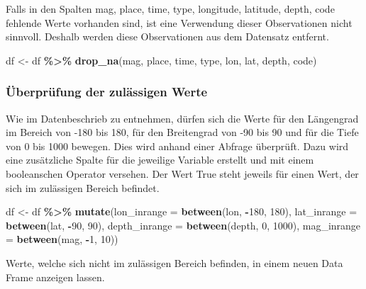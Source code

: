 \documentclass[
]{article}
\newenvironment{Shaded}{\begin{snugshade}}{\end{snugshade}}
\newcommand{\AttributeTok}[1]{\textcolor[rgb]{0.13,0.29,0.53}{#1}}
\newcommand{\DecValTok}[1]{\textcolor[rgb]{0.00,0.00,0.81}{#1}}
\newcommand{\FunctionTok}[1]{\textcolor[rgb]{0.13,0.29,0.53}{\textbf{#1}}}
\newcommand{\NormalTok}[1]{#1}
\newcommand{\OtherTok}[1]{\textcolor[rgb]{0.56,0.35,0.01}{#1}}
\newcommand{\SpecialCharTok}[1]{\textcolor[rgb]{0.81,0.36,0.00}{\textbf{#1}}}
\begin{document}
Falls in den Spalten mag, place, time, type, longitude, latitude, depth,
code fehlende Werte vorhanden sind, ist eine Verwendung dieser
Observationen nicht sinnvoll. Deshalb werden diese Observationen aus dem
Datensatz entfernt.

\begin{Shaded}
\begin{Highlighting}[]
\NormalTok{df }\OtherTok{\textless{}{-}}\NormalTok{ df }\SpecialCharTok{\%\textgreater{}\%} 
  \FunctionTok{drop\_na}\NormalTok{(mag, place, time, type, lon, lat, depth, code)}
\end{Highlighting}
\end{Shaded}

\hypertarget{uxfcberpruxfcfung-der-zuluxe4ssigen-werte}{%
\subsubsection{Überprüfung der zulässigen
Werte}\label{uxfcberpruxfcfung-der-zuluxe4ssigen-werte}}

Wie im Datenbeschrieb zu entnehmen, dürfen sich die Werte für den
Längengrad im Bereich von -180 bis 180, für den Breitengrad von -90 bis
90 und für die Tiefe von 0 bis 1000 bewegen. Dies wird anhand einer
Abfrage überprüft. Dazu wird eine zusätzliche Spalte für die jeweilige
Variable erstellt und mit einem booleanschen Operator versehen. Der Wert
True steht jeweils für einen Wert, der sich im zulässigen Bereich
befindet.

\begin{Shaded}
\begin{Highlighting}[]
\NormalTok{df }\OtherTok{\textless{}{-}}\NormalTok{ df }\SpecialCharTok{\%\textgreater{}\%}
  \FunctionTok{mutate}\NormalTok{(}\AttributeTok{lon\_inrange =} \FunctionTok{between}\NormalTok{(lon, }\SpecialCharTok{{-}}\DecValTok{180}\NormalTok{, }\DecValTok{180}\NormalTok{),}
         \AttributeTok{lat\_inrange =} \FunctionTok{between}\NormalTok{(lat, }\SpecialCharTok{{-}}\DecValTok{90}\NormalTok{, }\DecValTok{90}\NormalTok{),}
         \AttributeTok{depth\_inrange =} \FunctionTok{between}\NormalTok{(depth, }\DecValTok{0}\NormalTok{, }\DecValTok{1000}\NormalTok{),}
         \AttributeTok{mag\_inrange =} \FunctionTok{between}\NormalTok{(mag, }\SpecialCharTok{{-}}\DecValTok{1}\NormalTok{, }\DecValTok{10}\NormalTok{))}
\end{Highlighting}
\end{Shaded}

Werte, welche sich nicht im zulässigen Bereich befinden, in einem neuen
Data Frame anzeigen lassen.
\end{document}
